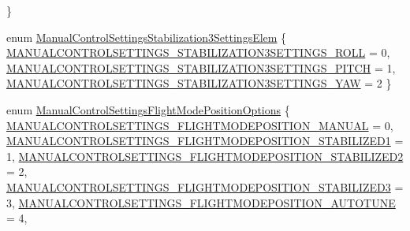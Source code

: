 \begin{DoxyCompactItemize}
 \}
\item 
enum \hyperlink{group___manual_control_settings_gab250cdcd53be98333acc0bff1cbecbaa}{\-Manual\-Control\-Settings\-Stabilization3\-Settings\-Elem} \{ \hyperlink{group___manual_control_settings_ggab250cdcd53be98333acc0bff1cbecbaaa437b0381c680c7d972c3a09f4b7d1365}{\-M\-A\-N\-U\-A\-L\-C\-O\-N\-T\-R\-O\-L\-S\-E\-T\-T\-I\-N\-G\-S\-\_\-\-S\-T\-A\-B\-I\-L\-I\-Z\-A\-T\-I\-O\-N3\-S\-E\-T\-T\-I\-N\-G\-S\-\_\-\-R\-O\-L\-L} = 0, 
\hyperlink{group___manual_control_settings_ggab250cdcd53be98333acc0bff1cbecbaaa9feb91b8a6d7d501ec9114496e7223af}{\-M\-A\-N\-U\-A\-L\-C\-O\-N\-T\-R\-O\-L\-S\-E\-T\-T\-I\-N\-G\-S\-\_\-\-S\-T\-A\-B\-I\-L\-I\-Z\-A\-T\-I\-O\-N3\-S\-E\-T\-T\-I\-N\-G\-S\-\_\-\-P\-I\-T\-C\-H} = 1, 
\hyperlink{group___manual_control_settings_ggab250cdcd53be98333acc0bff1cbecbaaa152cd7d031966cce840801c16f2666b3}{\-M\-A\-N\-U\-A\-L\-C\-O\-N\-T\-R\-O\-L\-S\-E\-T\-T\-I\-N\-G\-S\-\_\-\-S\-T\-A\-B\-I\-L\-I\-Z\-A\-T\-I\-O\-N3\-S\-E\-T\-T\-I\-N\-G\-S\-\_\-\-Y\-A\-W} = 2
 \}
\item 
enum \hyperlink{group___manual_control_settings_ga5935c8977b39792a0ec5d4512eec6b53}{\-Manual\-Control\-Settings\-Flight\-Mode\-Position\-Options} \{ \*
\hyperlink{group___manual_control_settings_gga5935c8977b39792a0ec5d4512eec6b53a2d7283b145bbfa4c945f84292bd0acb8}{\-M\-A\-N\-U\-A\-L\-C\-O\-N\-T\-R\-O\-L\-S\-E\-T\-T\-I\-N\-G\-S\-\_\-\-F\-L\-I\-G\-H\-T\-M\-O\-D\-E\-P\-O\-S\-I\-T\-I\-O\-N\-\_\-\-M\-A\-N\-U\-A\-L} = 0, 
\hyperlink{group___manual_control_settings_gga5935c8977b39792a0ec5d4512eec6b53a4cb1260af3d4135ffb84e07c4ba597ad}{\-M\-A\-N\-U\-A\-L\-C\-O\-N\-T\-R\-O\-L\-S\-E\-T\-T\-I\-N\-G\-S\-\_\-\-F\-L\-I\-G\-H\-T\-M\-O\-D\-E\-P\-O\-S\-I\-T\-I\-O\-N\-\_\-\-S\-T\-A\-B\-I\-L\-I\-Z\-E\-D1} = 1, 
\hyperlink{group___manual_control_settings_gga5935c8977b39792a0ec5d4512eec6b53ad4d2ac2721d82dea1a01e10ddb7f9de8}{\-M\-A\-N\-U\-A\-L\-C\-O\-N\-T\-R\-O\-L\-S\-E\-T\-T\-I\-N\-G\-S\-\_\-\-F\-L\-I\-G\-H\-T\-M\-O\-D\-E\-P\-O\-S\-I\-T\-I\-O\-N\-\_\-\-S\-T\-A\-B\-I\-L\-I\-Z\-E\-D2} = 2, 
\hyperlink{group___manual_control_settings_gga5935c8977b39792a0ec5d4512eec6b53a636317be7eef5b802adcede7ac636d0d}{\-M\-A\-N\-U\-A\-L\-C\-O\-N\-T\-R\-O\-L\-S\-E\-T\-T\-I\-N\-G\-S\-\_\-\-F\-L\-I\-G\-H\-T\-M\-O\-D\-E\-P\-O\-S\-I\-T\-I\-O\-N\-\_\-\-S\-T\-A\-B\-I\-L\-I\-Z\-E\-D3} = 3, 
\*
\hyperlink{group___manual_control_settings_gga5935c8977b39792a0ec5d4512eec6b53aeb27e819b1cab77d87ff65c02c77e452}{\-M\-A\-N\-U\-A\-L\-C\-O\-N\-T\-R\-O\-L\-S\-E\-T\-T\-I\-N\-G\-S\-\_\-\-F\-L\-I\-G\-H\-T\-M\-O\-D\-E\-P\-O\-S\-I\-T\-I\-O\-N\-\_\-\-A\-U\-T\-O\-T\-U\-N\-E} = 4, 

\end{DoxyCompactItemize}
